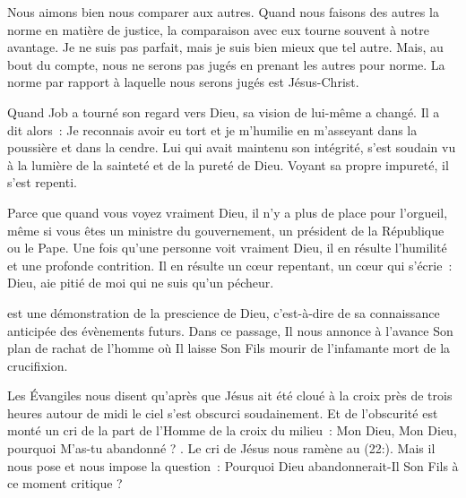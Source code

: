 Nous aimons bien nous comparer aux autres.
 Quand nous faisons des autres la norme en matière de justice,
 la comparaison avec eux tourne souvent à notre avantage.
 \og Je ne suis pas parfait, mais je suis bien mieux que tel autre. \fg{}
 Mais, au bout du compte, nous ne serons pas jugés en prenant
 les autres pour norme.
 La norme par rapport à laquelle nous serons jugés est Jésus-Christ.

Quand Job a tourné son regard vers Dieu, sa vision de lui-même a changé.
 Il a dit alors~: \og Je reconnais avoir eu tort et je m'humilie en m'asseyant
 dans la poussière et dans la cendre. \fg{}
 Lui qui avait maintenu son intégrité, s'est soudain vu à la lumière
 de la sainteté et de la pureté de Dieu.
 Voyant sa propre impureté, il s'est repenti.


Parce que quand vous voyez vraiment Dieu,
 il n'y a plus de place pour l'orgueil,
 même si vous êtes un ministre du gouvernement,
 un président de la République ou le Pape.
 Une fois qu'une personne voit vraiment Dieu,
 il en résulte l'humilité et une profonde contrition.
 Il en résulte un cœur repentant,
 un cœur qui s'écrie~:
 \og Dieu, aie pitié de moi qui ne suis qu'un pécheur. \fg{}

\dvrule






 est une démonstration
 de la prescience de Dieu, c'est-à-dire de sa connaissance anticipée
 des évènements futurs.
 Dans ce passage, Il nous annonce à l'avance Son plan de rachat
 de l'homme où Il laisse Son Fils mourir de l'infamante mort de la crucifixion.

Les Évangiles nous disent qu'après que Jésus ait été cloué à la croix
 près de trois heures \ocadr{}autour de midi\fcadr{} le ciel s'est obscurci soudainement.
 Et de l'obscurité est monté un cri de la part de l'Homme de la croix du milieu~:
 \og Mon Dieu, Mon Dieu, pourquoi M'as-tu abandonné ? \fg{}.
 Le cri de Jésus nous ramène au (22:).
 Mais il nous pose et nous impose la question~:
 Pourquoi Dieu abandonnerait-Il Son Fils à ce moment critique ?

